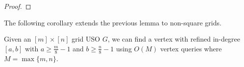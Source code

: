 \documentclass[runningheads,a4paper]{llncs}
\newcommand{\MM}[1]{\marginpar{\parbox{3.6cm}{{\small {\bf MM:} #1}}}} %
\newcommand{\indegree}{refined in-degree\xspace}
\begin{document}
\begin{proof}
\end{proof}

The following corollary extends the previous lemma to non-square grids.

\begin{corollary}\label{corollary: n/4 indegree}
  Given an $[m]\times [n]$ grid USO $G$, we can find a vertex with \indegree $[a,b]$ with $a \geq \frac{m}{8} - 1$ and  $b \geq \frac{n}{8} - 1$ using $O(M)$ vertex queries where $M = \max\{m,n\}$.
\end{corollary}
\end{document}

